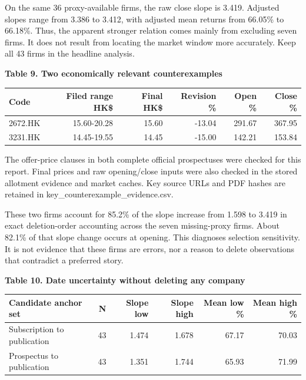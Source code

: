 \documentclass[10pt,a4paper]{article}
\begin{document}
On the same 36 proxy-available firms, the raw close slope is 3.419. Adjusted slopes range from 3.386 to 3.412, with adjusted mean returns from 66.05\% to 66.18\%. Thus, the apparent stronger relation comes mainly from excluding seven firms. It does not result from locating the market window more accurately. Keep all 43 firms in the headline analysis.

\par\addvspace{5pt}\textbf{Table 9. Two economically relevant counterexamples}\par\nobreak\vspace{2pt}

{\small\renewcommand{\arraystretch}{1.10}\begin{tabularx}{\textwidth}{@{}Xrrrrr@{}}\toprule

\textbf{Code} & \textbf{Filed range HK\$} & \textbf{Final HK\$} & \textbf{Revision \%} & \textbf{Open \%} & \textbf{Close \%} \\\midrule

2672.HK & 15.60-20.28 & 15.60 & -13.04 & 291.67 & 367.95 \\

3231.HK & 14.45-19.55 & 14.45 & -15.00 & 142.21 & 153.84 \\

\bottomrule\end{tabularx}}\par

{\footnotesize The offer-price clauses in both complete official prospectuses were checked for this report. Final prices and raw opening/close inputs were also checked in the stored allotment evidence and market caches. Key source URLs and PDF hashes are retained in key\_counterexample\_evidence.csv.}\par

These two firms account for 85.2\% of the slope increase from 1.598 to 3.419 in exact deletion-order accounting across the seven missing-proxy firms. About 82.1\% of that slope change occurs at opening. This diagnoses selection sensitivity. It is not evidence that these firms are errors, nor a reason to delete observations that contradict a preferred story.

\par\addvspace{5pt}\textbf{Table 10. Date uncertainty without deleting any company}\par\nobreak\vspace{2pt}

{\small\renewcommand{\arraystretch}{1.10}\begin{tabularx}{\textwidth}{@{}Xrrrrr@{}}\toprule

\textbf{Candidate anchor set} & \textbf{N} & \textbf{Slope low} & \textbf{Slope high} & \textbf{Mean low \%} & \textbf{Mean high \%} \\\midrule

Subscription to publication & 43 & 1.474 & 1.678 & 67.17 & 70.03 \\

Prospectus to publication & 43 & 1.351 & 1.744 & 65.93 & 71.99 \\

\bottomrule\end{tabularx}}\par
\end{document}
